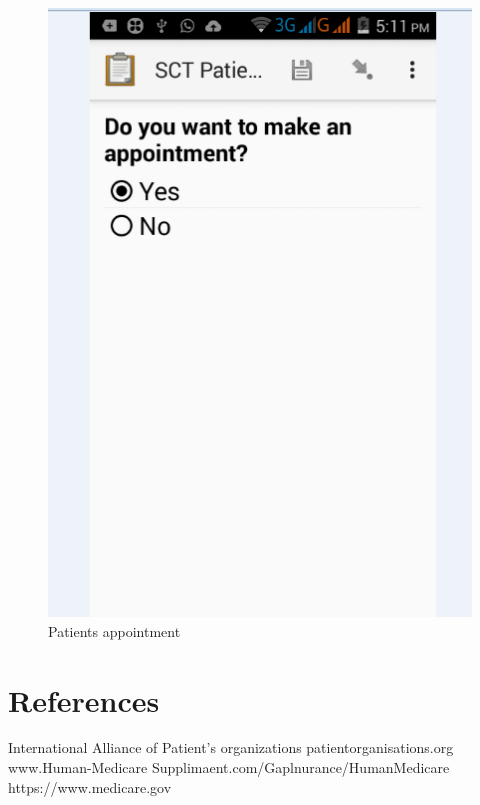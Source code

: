 \documentclass[12pt,]{article}
\begin{document}
\begin{figure}
\includegraphics[width=\linewidth]{appoint.png}
\caption{Patients appointment}
\end{figure}
\newpage

\section{References}
International Alliance of Patient’s organizations patientorganisations.org
www.Human-Medicare Supplimaent.com/Gaplnurance/HumanMedicare
https://www.medicare.gov
\end{document}

